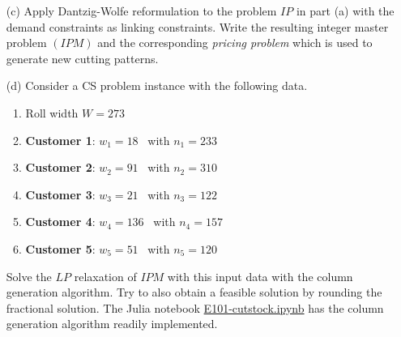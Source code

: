 \begin{itemize}[itemsep=10pt]
\item[(c)] Apply Dantzig-Wolfe reformulation to the problem $IP$ in part (a) with the demand \lb constraints as linking constraints. Write the resulting integer master problem $(IPM)$ and the corresponding \emph{pricing problem} which is used to generate new cutting patterns. 
\item[(d)] Consider a CS problem instance with the following data.
\vspace{5pt}
\begin{enumerate}
 \item Roll width $W = 273$
 \item \textbf{Customer 1}: $w_1 = 18$ ~with $n_1 = 233$
 \item \textbf{Customer 2}: $w_2 = 91$ ~with $n_2 = 310$
 \item \textbf{Customer 3}: $w_3 = 21$ ~with $n_3 = 122$ 
 \item \textbf{Customer 4}: $w_4 = 136$     ~with $n_4 = 157$
 \item \textbf{Customer 5}: $w_5 = 51$ ~with $n_5 = 120$
\end{enumerate}
\vspace{5pt}
Solve the $LP$ relaxation of $IPM$ with this input data with the column generation algorithm. Try to also obtain a feasible solution by rounding the fractional solution. The Julia notebook \href{https://mycourses.aalto.fi/mod/folder/view.php?id=651694}{E101-cutstock.ipynb} has the column generation algorithm readily implemented.
\end{itemize}